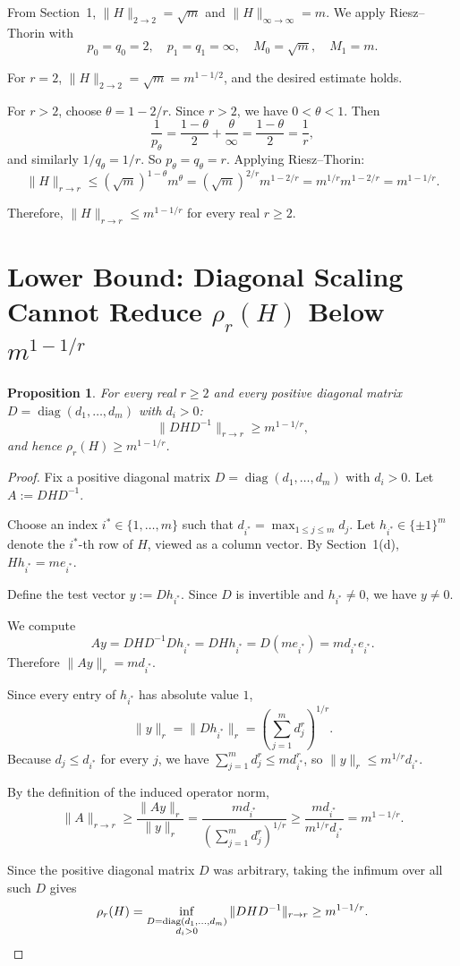 \documentclass{article}
\newtheorem{proposition}[theorem]{Proposition}
\begin{document}
From Section~1, $\|H\|_{2\to 2}=\sqrt{m}$ and $\|H\|_{\infty\to\infty}=m$. We apply Riesz--Thorin with
\[
p_0=q_0=2, \quad p_1=q_1=\infty, \quad M_0=\sqrt{m}, \quad M_1=m.
\]

For $r=2$, $\|H\|_{2\to 2}=\sqrt{m}=m^{1-1/2}$, and the desired estimate holds.

For $r>2$, choose $\theta=1-2/r$. Since $r>2$, we have $0<\theta<1$. Then
\[
\frac{1}{p_\theta} = \frac{1-\theta}{2} + \frac{\theta}{\infty} = \frac{1-\theta}{2} = \frac{1}{r},
\]
and similarly $1/q_\theta = 1/r$. So $p_\theta = q_\theta = r$. Applying Riesz--Thorin:
\[
\|H\|_{r\to r} \le (\sqrt{m})^{1-\theta} m^\theta = (\sqrt{m})^{2/r} m^{1-2/r} = m^{1/r} m^{1-2/r} = m^{1-1/r}.
\]

Therefore, $\|H\|_{r\to r}\le m^{1-1/r}$ for every real $r\ge 2$.

\section{Lower Bound: Diagonal Scaling Cannot Reduce $\rho_r(H)$ Below $m^{1-1/r}$}

\begin{proposition}
For every real $r \geq 2$ and every positive diagonal matrix $D = \operatorname{diag}(d_1, \ldots, d_m)$ with $d_i > 0$:
\[
\|D H D^{-1}\|_{r \to r} \geq m^{1-1/r},
\]
and hence $\rho_r(H) \geq m^{1-1/r}$.
\end{proposition}

\begin{proof}
Fix a positive diagonal matrix $D=\operatorname{diag}(d_1,\ldots,d_m)$ with $d_i>0$. Let $A:=DHD^{-1}$.

Choose an index $i^*\in\{1,\ldots,m\}$ such that $d_{i^*}=\max_{1\le j\le m} d_j$. Let $h_{i^*}\in\{\pm 1\}^m$ denote the $i^*$-th row of $H$, viewed as a column vector. By Section~1(d), $Hh_{i^*}=me_{i^*}$.

Define the test vector $y:=Dh_{i^*}$. Since $D$ is invertible and $h_{i^*}\neq 0$, we have $y\neq 0$.

We compute
\[
Ay = DHD^{-1}Dh_{i^*} = DHh_{i^*} = D(me_{i^*}) = md_{i^*}e_{i^*}.
\]
Therefore $\|Ay\|_r = md_{i^*}$.

Since every entry of $h_{i^*}$ has absolute value $1$,
\[
\|y\|_r = \|Dh_{i^*}\|_r = \left(\sum_{j=1}^m d_j^r\right)^{1/r}.
\]
Because $d_j\le d_{i^*}$ for every $j$, we have $\sum_{j=1}^m d_j^r \le m d_{i^*}^r$, so $\|y\|_r \le m^{1/r}d_{i^*}$.

By the definition of the induced operator norm,
\[
\|A\|_{r\to r} \ge \frac{\|Ay\|_r}{\|y\|_r} = \frac{md_{i^*}}{\left(\sum_{j=1}^m d_j^r\right)^{1/r}} \ge \frac{md_{i^*}}{m^{1/r}d_{i^*}} = m^{1-1/r}.
\]

Since the positive diagonal matrix $D$ was arbitrary, taking the infimum over all such $D$ gives
\[
\rho_r(H) = \inf_{\substack{D=\operatorname{diag}(d_1,\ldots,d_m)\\ d_i>0}} \|DHD^{-1}\|_{r\to r} \ge m^{1-1/r}. \qedhere
\]
\end{proof}
\end{document}
